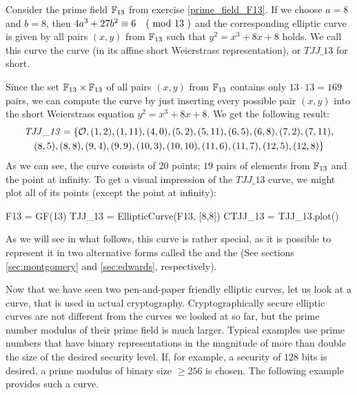 \begin{example}\label{TJJ13} Consider the prime field $\mathbb{F}_{13}$ from exercise \ref{prime_field_F13}. If we choose $a=8$ and $b=8$, then $4a^3+ 27b^2 \equiv 6 \quad \text{( mod } 13 \text{ )}$ and the corresponding elliptic curve is given by all pairs $(x,y)$ from $\mathbb{F}_{13}$ such that $y^2=x^3+8x+8$ holds. We call this curve the  curve (in its affine short Weierstrass representation), or $\mathit{TJJ\_13}$ for short.

Since the set $\mathbb{F}_{13}\times \mathbb{F}_{13}$ of all pairs $(x,y)$ from $\mathbb{F}_{13}$ contains only $13\cdot 13=169$ pairs, we can compute the curve by just inserting every possible pair $(x,y)$ into the short Weierstrass equation $y^2 = x^3 +8x +8$.  We get the following result:
\begin{multline}\label{eq:TJJ13-weierstrass}
\mathit{TJJ\_13} = \{\mathcal{O}, (1, 2), (1, 11), (4, 0), (5, 2), (5, 11), (6, 5), (6, 8), (7,2), (7, 11), \\ (8, 5), (8, 8), (9, 4), (9, 9), (10, 3), (10,10), (11, 6), (11, 7), (12, 5), (12, 8)\}
\end{multline}
As we can see, the curve consists of $20$ points; $19$ pairs of elements from $\mathbb{F}_{13}$ and the point at infinity. To get a visual impression of the $\mathit{TJJ\_13}$ curve, we might plot all of its points (except the point at infinity): 
\begin{sagesilent}
F13 = GF(13)
TJJ_13 = EllipticCurve(F13, [8,8])
CTJJ_13 = TJJ_13.plot()
\end{sagesilent}
\begin{center} 
\end{center}
As we will see in what follows, this curve is rather special, as it is possible to represent it in two alternative forms called the  and the  (See sections \ref{sec:montgomery} and \ref{sec:edwards}, respectively).
\end{example}
Now that we have seen two pen-and-paper friendly elliptic curves, let us look at a curve, that is used in actual cryptography. Cryptographically secure elliptic curves are not  different from the curves we looked at so far, but the prime number modulus of their prime field is much larger. Typical examples use prime numbers that have binary representations in the magnitude of more than double the size of the desired security level. If, for example, a security of $128$ bits is desired, a prime modulus of binary size $\geq 256$ is chosen. The following example provides such a curve. 

